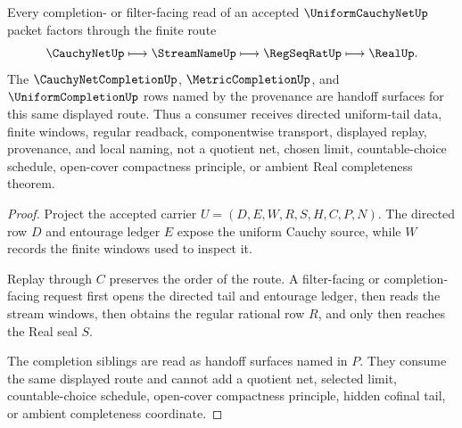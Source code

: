 \begin{theorem}
\label{thm:uniform-cauchy-net-filter-handoff}
Every completion- or filter-facing read of an accepted $\UniformCauchyNetUp$ packet factors through the finite route
$$
\CauchyNetUp
\longmapsto
\StreamNameUp
\longmapsto
\RegSeqRatUp
\longmapsto
\RealUp .
$$
The $\CauchyNetCompletionUp$, $\MetricCompletionUp$, and $\UniformCompletionUp$ rows named by the provenance are handoff surfaces for this same displayed route. Thus a consumer receives directed uniform-tail data, finite windows, regular readback, componentwise transport, displayed replay, provenance, and local naming, not a quotient net, chosen limit, countable-choice schedule, open-cover compactness principle, or ambient Real completeness theorem.
\end{theorem}
\begin{proof}
Project the accepted carrier $U=(D,E,W,R,S,H,C,P,N)$. The directed row $D$ and entourage ledger $E$ expose the uniform Cauchy source, while $W$ records the finite windows used to inspect it.

Replay through $C$ preserves the order of the route. A filter-facing or completion-facing request first opens the directed tail and entourage ledger, then reads the stream windows, then obtains the regular rational row $R$, and only then reaches the Real seal $S$.

The completion siblings are read as handoff surfaces named in $P$. They consume the same displayed route and cannot add a quotient net, selected limit, countable-choice schedule, open-cover compactness principle, hidden cofinal tail, or ambient completeness coordinate.
\end{proof}

